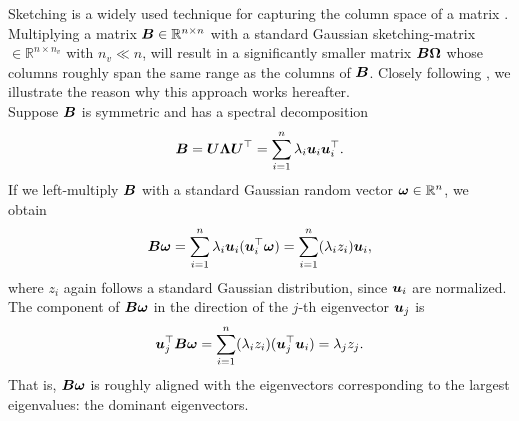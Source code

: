 Sketching is a widely used technique for capturing the column space of a matrix
\cite{halko2011finding,woodruff2014sketching,lin2017randomized,tropp2017sketching,tropp2023randomized}.
Multiplying a matrix $\boldsymbol{B} \in \mathbb{R}^{n \times n}$ with a standard Gaussian
\gls{sketching-matrix} $ \in \mathbb{R}^{n \times n_v}$ with $n_v \ll n$, will
result in a significantly smaller matrix $\boldsymbol{B}\boldsymbol{\Omega}$ whose
columns roughly span the same range as the columns of $\boldsymbol{B}$.
Closely following \cite[Section~2.1]{tropp2023randomized}, we illustrate the
reason why this approach works hereafter.\\
Suppose $\boldsymbol{B}$ is symmetric and has a spectral decomposition
\begin{equation}
    \boldsymbol{B}
        = \boldsymbol{U} \boldsymbol{\Lambda} \boldsymbol{U}^{\top} 
        = \sum_{i=1}^n \lambda_i \boldsymbol{u}_i \boldsymbol{u}_i^{\top}.
    \label{equ:3-nystrom-sketching-spectral-decomposition}
\end{equation}
If we left-multiply $\boldsymbol{B}$ with a standard Gaussian random vector $\boldsymbol{\omega} \in \mathbb{R}^n$,
we obtain
\begin{equation}
    \boldsymbol{B}\boldsymbol{\omega}
        = \sum_{i=1}^n \lambda_i \boldsymbol{u}_i (\boldsymbol{u}_i^{\top} \boldsymbol{\omega})
        = \sum_{i=1}^n (\lambda_i  z_i) \boldsymbol{u}_i,
        \label{equ:3-nystrom-sketching-random-multiplication}
\end{equation}
where $z_i$ again follows a standard Gaussian distribution, since $\boldsymbol{u}_i$ are
normalized. The component of $\boldsymbol{B}\boldsymbol{\omega}$ in the direction of the
$j$-th eigenvector $\boldsymbol{u}_j$ is
\begin{equation}
    \boldsymbol{u}_j^{\top}\boldsymbol{B}\boldsymbol{\omega}
        = \sum_{i=1}^n (\lambda_i  z_i) (\boldsymbol{u}_j^{\top} \boldsymbol{u}_i)
        = \lambda_j  z_j.
        \label{equ:3-nystrom-sketching-dominant-component}
\end{equation}
That is, $\boldsymbol{B}\boldsymbol{\omega}$ is roughly aligned with the eigenvectors corresponding
to the largest eigenvalues: the dominant eigenvectors.\\


